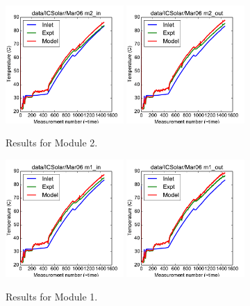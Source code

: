 \documentclass{article}
\begin{document}
\clearpage
\begin{figure}[!ht]
\centering
\includegraphics[width=0.4\textwidth]{../../data/ICSolar/images/Mar06_m2_in.pdf}\hspace{0.05\textwidth}
\includegraphics[width=0.4\textwidth]{../../data/ICSolar/images/Mar06_m2_out.pdf}\hspace{0.05\textwidth}\\
\caption{Results for Module 2.}\end{figure}
\begin{figure}[!ht]
\centering
\includegraphics[width=0.4\textwidth]{../../data/ICSolar/images/Mar06_m1_in.pdf}\hspace{0.05\textwidth}
\includegraphics[width=0.4\textwidth]{../../data/ICSolar/images/Mar06_m1_out.pdf}\hspace{0.05\textwidth}\\
\caption{Results for Module 1.}\end{figure}
\end{document}
